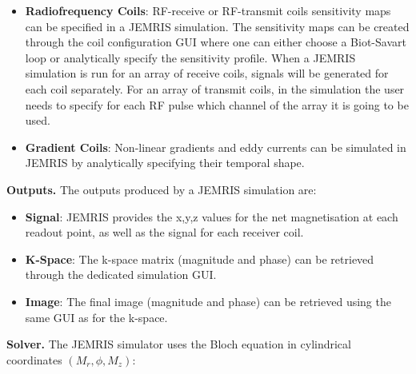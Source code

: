 \begin{itemize}
    \item \textbf{Radiofrequency Coils}: RF-receive or RF-transmit coils sensitivity maps can be specified in a JEMRIS simulation. 
    The sensitivity maps can be created through the coil configuration GUI where one can either choose a Biot-Savart loop or analytically specify the sensitivity profile.
    When a JEMRIS simulation is run for an array of receive coils, signals will be generated for each coil separately.
    For an array of transmit coils, in the simulation the user needs to specify for each RF pulse which channel of the array it is going to be used.
    
    \item \textbf{Gradient Coils}: Non-linear gradients and eddy currents can be simulated in JEMRIS by analytically specifying their temporal shape.
    
\end{itemize}


\hfill

\textbf{Outputs.} The outputs produced by a JEMRIS simulation are:
\begin{itemize}
    
    \item \textbf{Signal}: JEMRIS provides the x,y,z values for the net magnetisation at each readout point, as well as the signal for each receiver coil. 
    
    \item \textbf{K-Space}: The k-space matrix (magnitude and phase) can be retrieved through the dedicated simulation GUI.
    
    \item \textbf{Image}: The final image (magnitude and phase) can be retrieved using the same GUI as for the k-space.
    
\end{itemize}

\hfill

\textbf{Solver.} The JEMRIS simulator uses the Bloch equation 
in cylindrical coordinates $(M_r, \phi, M_z)$:

